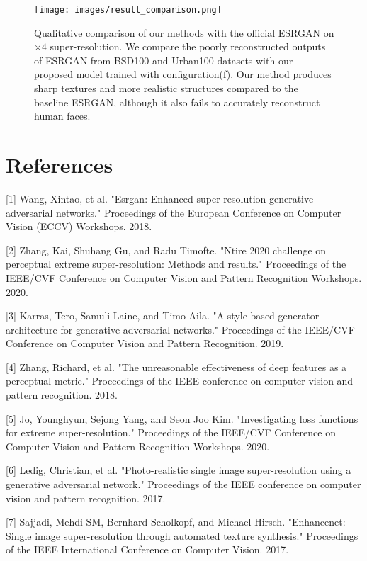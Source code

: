 \documentclass{article}
\begin{document}
\begin{figure}
    \centering
    \texttt{[image: images/result\_comparison.png]}
    \caption{Qualitative comparison of our methods with the official ESRGAN on $\times 4$ super-resolution. We compare the poorly reconstructed outputs of ESRGAN from BSD100 and Urban100 datasets with our proposed model trained with configuration(f). Our method produces sharp textures and more realistic structures compared to the baseline ESRGAN, although it also fails to accurately reconstruct human faces.}
\end{figure}

\section*{References}

\medskip

\small

[1] Wang, Xintao, et al. "Esrgan: Enhanced super-resolution generative adversarial networks." Proceedings of the European Conference on Computer Vision (ECCV) Workshops. 2018.

[2] Zhang, Kai, Shuhang Gu, and Radu Timofte. "Ntire 2020 challenge on perceptual extreme super-resolution: Methods and results." Proceedings of the IEEE/CVF Conference on Computer Vision and Pattern Recognition Workshops. 2020.

[3] Karras, Tero, Samuli Laine, and Timo Aila. "A style-based generator architecture for generative adversarial networks." Proceedings of the IEEE/CVF Conference on Computer Vision and Pattern Recognition. 2019.

[4] Zhang, Richard, et al. "The unreasonable effectiveness of deep features as a perceptual metric." Proceedings of the IEEE conference on computer vision and pattern recognition. 2018.

[5] Jo, Younghyun, Sejong Yang, and Seon Joo Kim. "Investigating loss functions for extreme super-resolution." Proceedings of the IEEE/CVF Conference on Computer Vision and Pattern Recognition Workshops. 2020.

[6] Ledig, Christian, et al. "Photo-realistic single image super-resolution using a generative adversarial network." Proceedings of the IEEE conference on computer vision and pattern recognition. 2017.

[7] Sajjadi, Mehdi SM, Bernhard Scholkopf, and Michael Hirsch. "Enhancenet: Single image super-resolution through automated texture synthesis." Proceedings of the IEEE International Conference on Computer Vision. 2017.
\end{document}

